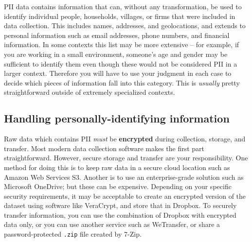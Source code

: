 PII data contains information that can, without any transformation, be used to identify
individual people, households, villages, or firms that were included in data collection.
This includes names, addresses, and geolocations, and extends to personal information
such as email addresses, phone numbers, and financial information.
In some contexts this list may be more extensive --
for example, if you are working in a small environment,
someone's age and gender may be sufficient to identify them
even though these would not be considered PII in a larger context.
Therefore you will have to use your judgment in each case
to decide which pieces of information fall into this category.
This is \textit{usually} pretty straightforward outside of extremely specialized contexts.

\subsection{Handling personally-identifying information}

Raw data which contains PII \textit{must} be \textbf{encrypted}
during collection, storage, and transfer.
Most modern data collection software makes the first part straightforward.
However, secure storage and transfer are your responsibility.
One method for doing this is to keep raw data in a secure cloud location such as Amazon Web Services S3.
Another is to use an enterprise-grade solution such as Microsoft OneDrive; but these can be expensive.
Depending on your specific security requirements,
it may be acceptable to create an encrypted version of the dataset
using software like VeraCrypt, and store that in Dropbox.
To securely transfer information,
you can use the combination of Dropbox with encrypted data only,
or you can use another service such as WeTransfer,
or share a password-protected \texttt{.zip} file created by 7-Zip.

